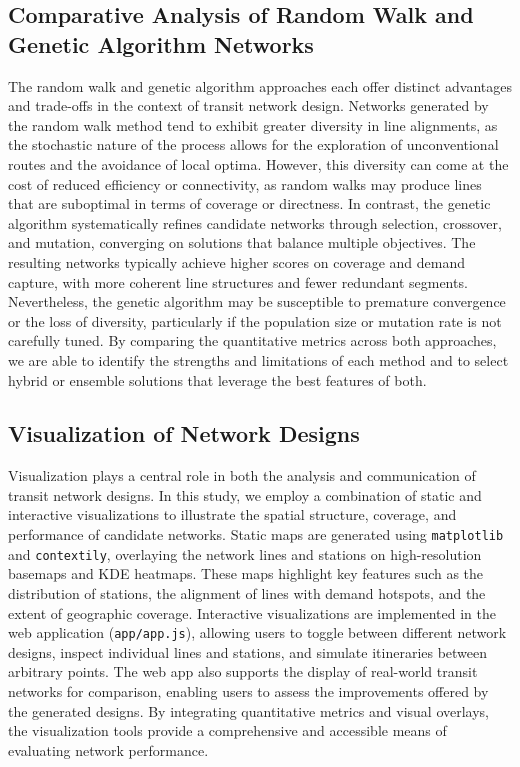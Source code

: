 \documentclass[manuscript,screen,review]{acmart}
\begin{document}
\subsection{Comparative Analysis of Random Walk and Genetic Algorithm Networks}
The random walk and genetic algorithm approaches each offer distinct advantages and trade-offs in the context of transit network design. Networks generated by the random walk method tend to exhibit greater diversity in line alignments, as the stochastic nature of the process allows for the exploration of unconventional routes and the avoidance of local optima. However, this diversity can come at the cost of reduced efficiency or connectivity, as random walks may produce lines that are suboptimal in terms of coverage or directness. In contrast, the genetic algorithm systematically refines candidate networks through selection, crossover, and mutation, converging on solutions that balance multiple objectives. The resulting networks typically achieve higher scores on coverage and demand capture, with more coherent line structures and fewer redundant segments. Nevertheless, the genetic algorithm may be susceptible to premature convergence or the loss of diversity, particularly if the population size or mutation rate is not carefully tuned. By comparing the quantitative metrics across both approaches, we are able to identify the strengths and limitations of each method and to select hybrid or ensemble solutions that leverage the best features of both.

\subsection{Visualization of Network Designs}
Visualization plays a central role in both the analysis and communication of transit network designs. In this study, we employ a combination of static and interactive visualizations to illustrate the spatial structure, coverage, and performance of candidate networks. Static maps are generated using \texttt{matplotlib} and \texttt{contextily}, overlaying the network lines and stations on high-resolution basemaps and KDE heatmaps. These maps highlight key features such as the distribution of stations, the alignment of lines with demand hotspots, and the extent of geographic coverage. Interactive visualizations are implemented in the web application (\texttt{app/app.js}), allowing users to toggle between different network designs, inspect individual lines and stations, and simulate itineraries between arbitrary points. The web app also supports the display of real-world transit networks for comparison, enabling users to assess the improvements offered by the generated designs. By integrating quantitative metrics and visual overlays, the visualization tools provide a comprehensive and accessible means of evaluating network performance.
\end{document}
